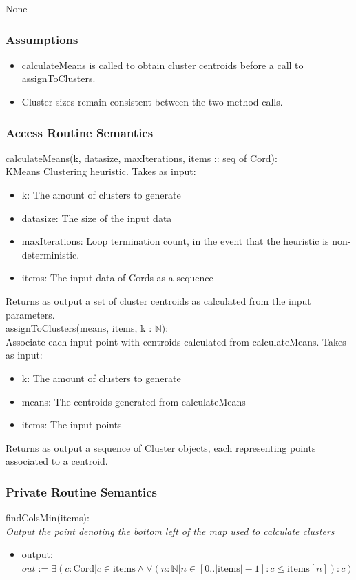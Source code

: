 \documentclass[12pt]{article}
\begin{document}
None

\subsubsection* {Assumptions}

\begin{itemize}
\item calculateMeans is called to obtain cluster centroids before a call
to assignToClusters.
\item Cluster sizes remain consistent between the two method calls.
\end{itemize}

\subsubsection* {Access Routine Semantics}

calculateMeans(k, datasize, maxIterations, items :: seq of Cord):\\
KMeans Clustering heuristic. Takes as input:
\begin{itemize}
\item k: The amount of clusters to generate
\item datasize: The size of the input data
\item maxIterations: Loop termination count, in the event that the
heuristic is non-deterministic.
\item items: The input data of Cords as a sequence
\end{itemize}
\noindent
Returns as output a set of cluster centroids as calculated from the 
input parameters.\\

\noindent
assignToClusters(means, items, k : $\mathbb{N}$):\\
Associate each input point with centroids calculated from calculateMeans.
Takes as input:
\begin{itemize}
\item k: The amount of clusters to generate
\item means: The centroids generated from calculateMeans
\item items: The input points
\end{itemize}
Returns as output a sequence of Cluster objects, each representing
points associated to a centroid.

\subsubsection* {Private Routine Semantics}
findColsMin(items):\\
\textit{Output the point denoting the bottom left of the map used to calculate clusters}
\begin{itemize}
\item output: $out := \exists (c : \mbox{Cord} | c \in \mbox{items} \land
                      \forall (n : \mathbb{N} | n \in [0..|\mbox{items}|-1] :
                      c \leq \mbox{items}[n]) : c)$
\end{itemize}
\end{document}
